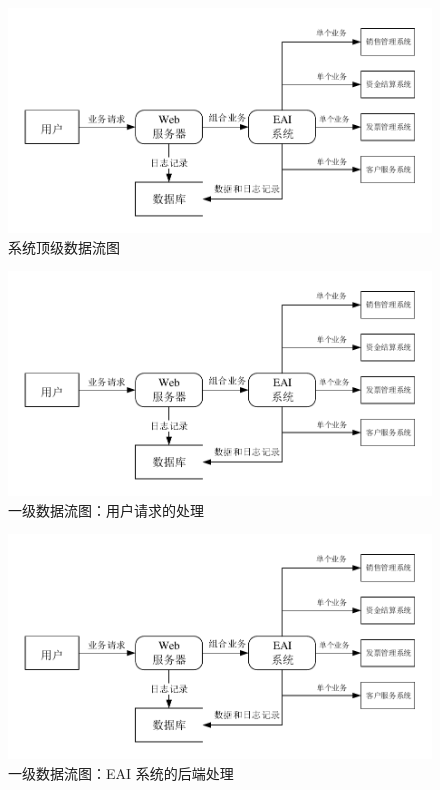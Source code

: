 \documentclass[cs4size,a4paper,nofonts]{ctexart}
\begin{document}
\begin{figure}[htp]
\includegraphics[width=\textwidth,page=1]{images/dfd.pdf}
\caption{\label{dfd0}系统顶级数据流图}
\end{figure}

\begin{figure}[htp]
\includegraphics[width=\textwidth,page=2]{images/dfd.pdf}
\caption{\label{dfd1.1}一级数据流图：用户请求的处理}
\end{figure}

\begin{figure}[htp]
\includegraphics[width=\textwidth,page=3]{images/dfd.pdf}
\caption{\label{dfd1.2}一级数据流图：EAI 系统的后端处理}
\end{figure}
\end{document}
